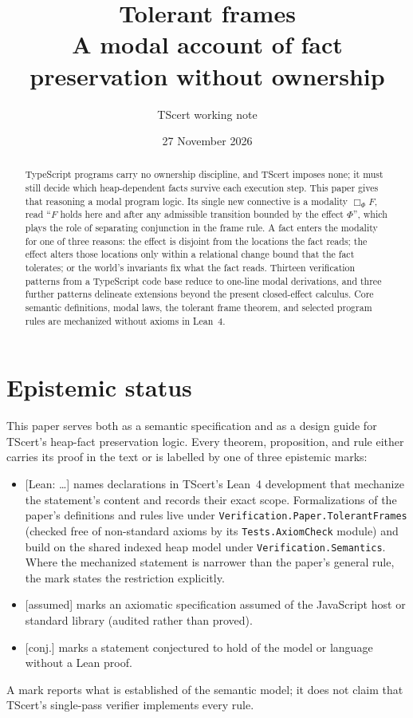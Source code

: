 \documentclass[10pt,a4paper]{article}
\title{Tolerant frames\\[2pt]\large A modal account of fact preservation without ownership}
\author{TScert working note}
\date{27 November 2026}
\theoremstyle{definition}
\theoremstyle{remark}
\newcommand{\bx}[1]{\Box_{#1}}
\newcommand{\lean}[1]{\texttt{\small #1}}
\newcommand{\status}[1]{\textsf{\small[#1]}}
\begin{document}
\maketitle

\begin{abstract}
\noindent
TypeScript programs carry no ownership discipline, and TScert imposes
none; it must still decide which heap-dependent facts survive each
execution step. This paper gives that reasoning a modal program logic.
Its single new connective is a modality $\bx{\Phi}F$, read ``$F$ holds
here and after any admissible transition bounded by the effect $\Phi$'',
which plays the role of separating conjunction in the frame rule. A fact
enters the modality for one of three reasons: the effect is disjoint
from the locations the fact reads; the effect alters those locations
only within a relational change bound that the fact tolerates; or the
world's invariants fix what the fact reads. Thirteen verification
patterns from a TypeScript code base reduce to one-line modal
derivations, and three further patterns delineate extensions beyond the
present closed-effect calculus. Core semantic definitions, modal laws,
the tolerant frame theorem, and selected program rules are mechanized
without axioms in Lean~4.
\end{abstract}

\section*{Epistemic status}

This paper serves both as a semantic specification and as a design guide
for TScert's heap-fact preservation logic. Every theorem, proposition,
and rule either carries its proof in the text or is labelled by one of
three epistemic marks:
\begin{itemize}[leftmargin=1.5em,itemsep=2pt]
\item \status{Lean: \ldots} names declarations in TScert's Lean~4
  development that mechanize the statement's content and records their
  exact scope. Formalizations of the paper's definitions and rules live
  under \lean{Verification.Paper.TolerantFrames} (checked free of
  non-standard axioms by its \lean{Tests.AxiomCheck} module) and build
  on the shared indexed heap model under \lean{Verification.Semantics}.
  Where the mechanized statement is narrower than the paper's general
  rule, the mark states the restriction explicitly.
\item \status{assumed} marks an axiomatic specification assumed of the
  JavaScript host or standard library (audited rather than proved).
\item \status{conj.} marks a statement conjectured to hold of the model
  or language without a Lean proof.
\end{itemize}
A mark reports what is established of the semantic model; it does not
claim that TScert's single-pass verifier implements every rule.
\end{document}
